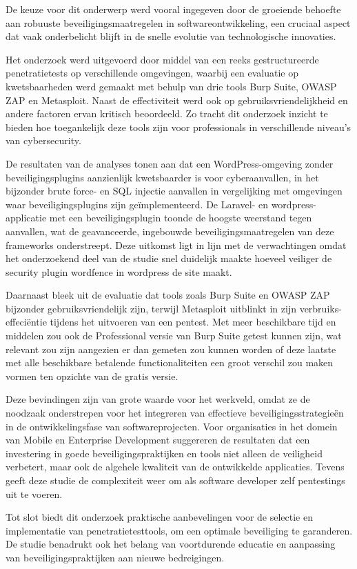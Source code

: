 De keuze voor dit onderwerp werd vooral ingegeven door de groeiende behoefte aan robuuste beveiligingsmaatregelen in softwareontwikkeling, een cruciaal 
aspect dat vaak onderbelicht blijft in de snelle evolutie van technologische innovaties. 

Het onderzoek werd uitgevoerd door middel van een reeks gestructureerde penetratietests op verschillende omgevingen, waarbij een evaluatie op 
kwetsbaarheden werd gemaakt met behulp van drie tools Burp Suite, OWASP ZAP en Metasploit. Naast de effectiviteit werd ook op gebruiksvriendelijkheid en andere factoren 
ervan kritisch beoordeeld. Zo tracht dit onderzoek inzicht te bieden hoe toegankelijk deze tools zijn voor professionals in verschillende 
niveau's van cybersecurity.

De resultaten van de analyses tonen aan dat een WordPress-omgeving zonder beveiligingsplugins aanzienlijk kwetsbaarder is voor cyberaanvallen, in het bijzonder  
brute force- en SQL injectie aanvallen in vergelijking met omgevingen waar beveiligingsplugins zijn geïmplementeerd. De Laravel- 
en wordpress-applicatie met een beveiligingsplugin toonde 
de hoogste weerstand tegen aanvallen, wat de geavanceerde, ingebouwde beveiligingsmaatregelen van deze frameworks onderstreept.
Deze uitkomst ligt in lijn met de verwachtingen omdat het onderzoekend deel van de studie snel duidelijk maakte hoeveel veiliger 
de security plugin wordfence in wordpress de site maakt.

Daarnaast bleek uit de evaluatie dat tools zoals Burp Suite en OWASP ZAP bijzonder gebruiksvriendelijk zijn, terwijl Metasploit 
uitblinkt in zijn verbruiks-effeciëntie tijdens het uitvoeren van een pentest. Met meer beschikbare tijd en middelen zou ook 
de Professional versie van Burp Suite getest kunnen zijn, wat relevant zou zijn aangezien er dan gemeten zou kunnen worden of deze 
laatste met alle beschikbare betalende functionaliteiten een groot verschil zou maken vormen ten opzichte van de gratis versie.

Deze bevindingen zijn van grote waarde voor het werkveld, omdat ze de noodzaak onderstrepen voor het integreren van effectieve 
beveiligingsstrategieën in de ontwikkelingsfase van softwareprojecten. Voor organisaties in het domein van Mobile en Enterprise 
Development suggereren de resultaten dat een investering in goede beveiligingspraktijken en tools niet alleen de veiligheid 
verbetert, maar ook de algehele kwaliteit van de ontwikkelde applicaties. Tevens geeft deze studie de complexiteit weer 
om als software developer zelf pentestings uit te voeren.

Tot slot biedt dit onderzoek praktische aanbevelingen voor de selectie en implementatie van penetratietesttools, 
om een optimale beveiliging te 
garanderen. De studie benadrukt ook het belang van voortdurende educatie en aanpassing van beveiligingspraktijken aan nieuwe 
bedreigingen.
